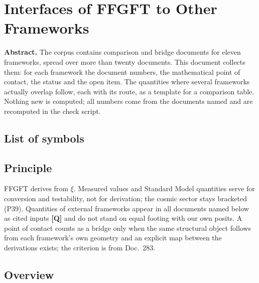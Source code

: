 \providecommand{\BM}{\textbf{[B]}}
\providecommand{\KM}{\textbf{[K]}}
\providecommand{\SM}{\textbf{[S]}}
\providecommand{\XM}{\textbf{[X]}}
\providecommand{\QM}{\textbf{[Q]}}

\chapter*{Interfaces of FFGFT to Other Frameworks}

{\small\noindent\textbf{Abstract.}\quad\ignorespaces
The corpus contains comparison and bridge documents for eleven frameworks,
spread over more than twenty documents. This document collects them: for each
framework the document numbers, the mathematical point of contact, the status
and the open item. The quantities where several frameworks actually overlap
follow, each with its route, as a template for a comparison table. Nothing new
is computed; all numbers come from the documents named and are recomputed in
the check script.
}\medskip

\section*{List of symbols}

\medskip


\section{Principle}

FFGFT derives from $\xi$. Measured values and Standard Model quantities serve
for conversion and testability, not for derivation; the cosmic sector stays
bracketed (P39). Quantities of external frameworks appear in all documents
named below as cited inputs \QM{} and do not stand on equal footing with our
own posits. A point of contact counts as a bridge only when the same
structural object follows from each framework's own geometry and an explicit
map between the derivations exists; the criterion is from Doc.~283.

\section{Overview}

